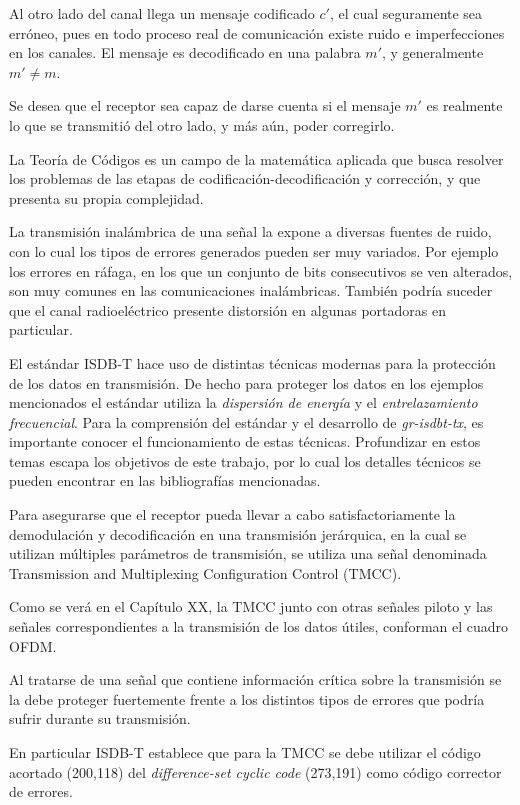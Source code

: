 Al otro lado del canal llega un mensaje codificado $c'$, el cual seguramente sea erróneo, pues en todo proceso real de comunicación existe ruido e imperfecciones en los canales. El mensaje es decodificado en una palabra $m'$, y generalmente $m' \neq m$.

Se desea que el receptor sea capaz de darse cuenta si el mensaje $m'$ es realmente lo que se transmitió del otro lado, y más aún, poder corregirlo. 

La Teoría de Códigos es un campo de la matemática aplicada que busca resolver los problemas de las etapas de codificación-decodificación y corrección, y que presenta su propia complejidad.

La transmisión inalámbrica de una señal la expone a diversas fuentes de ruido, con lo cual los tipos de errores generados pueden ser muy variados. Por ejemplo los errores en ráfaga, en los que un conjunto de bits consecutivos se ven alterados, son muy comunes en las comunicaciones inalámbricas. También podría suceder que el canal radioeléctrico presente distorsión en algunas portadoras en particular.

El estándar ISDB-T hace uso de distintas técnicas modernas para la protección de los datos en transmisión. De hecho para proteger los datos en los ejemplos mencionados el estándar utiliza la \textit{dispersión de energía} y el  \textit{entrelazamiento frecuencial}. Para la comprensión del estándar y el desarrollo de \textit{gr-isdbt-tx}, es importante conocer el funcionamiento de estas técnicas. Profundizar en estos temas escapa los objetivos de este trabajo, por lo cual los detalles técnicos se pueden encontrar en las bibliografías mencionadas.

Para asegurarse que el receptor pueda llevar a cabo satisfactoriamente la demodulación y decodificación en una transmisión jerárquica, en la cual se utilizan múltiples parámetros de transmisión, se utiliza una señal denominada Transmission and Multiplexing Configuration Control (TMCC).

Como se verá en el Capítulo XX, la TMCC junto con otras señales piloto y las señales correspondientes a la transmisión de los datos útiles, conforman el cuadro OFDM.

Al tratarse de una señal que contiene información crítica sobre la transmisión se la debe proteger fuertemente frente a los distintos tipos de errores que podría sufrir durante su transmisión.

En particular ISDB-T establece que para la TMCC se debe utilizar el código acortado (200,118) del \textit{difference-set cyclic code} (273,191) como código corrector de errores.

